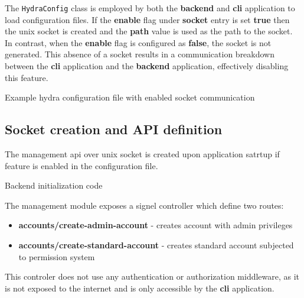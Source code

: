 \documentclass[../main.tex]{subfiles}
\begin{document}
The \texttt{HydraConfig} class is employed by both the \textbf{backend} and \textbf{cli} application to load configuration files.
If the \textbf{enable} flag under \textbf{socket} entry is set \textbf{true} then the unix socket is created and the \textbf{path} value is used as the path to the socket.
In contrast, when the \textbf{enable} flag is configured as \textbf{false}, the socket is not generated.
This absence of a socket results in a communication breakdown between the \textbf{cli} application and the \textbf{backend} application, effectively disabling this feature.

\begin{listing}[H]
  \caption{Example hydra configuration file with enabled socket communication}
\end{listing}

\subsection{Socket creation and API definition}

The management api over unix socket is created upon application satrtup if feature is enabled in the configuration file.

\begin{listing}[H]
  \caption{Backend initialization code}
\end{listing}

The management module exposes a signel controller which define two routes:

\begin{itemize}
  \item \textbf{accounts/create-admin-account} - creates account with admin privileges
  \item \textbf{accounts/create-standard-account} - creates standard account subjected to permission system
\end{itemize}

This controler does not use any authentication or authorization middleware, as it is not exposed to the internet and is only accessible by the \textbf{cli} application.
\end{document}
